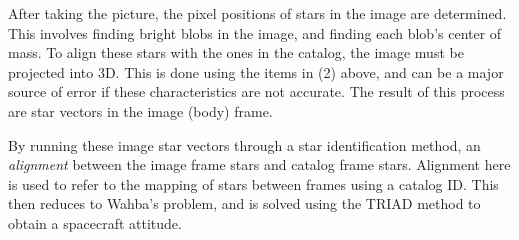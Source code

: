 After taking the picture, the pixel positions of stars in the  image are determined. This involves finding bright blobs in the image, and finding each blob's center of mass. To align these stars with the ones in the catalog, the image must be projected into 3D. This is done using the items in (2) above, and can be a major source of error if these characteristics are not accurate. The result of this process are star vectors in the image (body) frame. 

By running these image star vectors through a star identification method, an \textit{alignment} between the image frame stars and catalog frame stars. Alignment here is used to refer to the mapping of stars between frames using a catalog ID. This then reduces to Wahba's problem, and is solved using the TRIAD method to obtain a spacecraft attitude.
